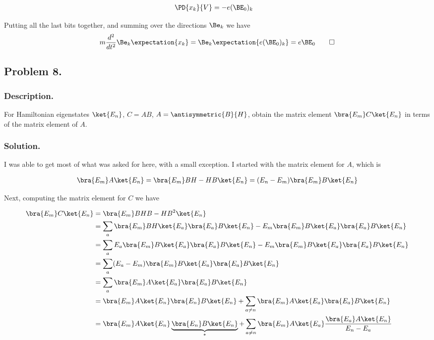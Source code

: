 \begin{align*}
\PD{x_k}{V} &= - e (\BE_0)_k
\end{align*}

Putting all the last bits together, and summing over the directions $\Be_k$ we have
\begin{align*}
m \frac{d^2}{dt^2} \Be_k \expectation{x_k} 
= \Be_k \expectation{ e (\BE_0)_k }
= e \BE_0
\qquad\square
\end{align*}

\subsection{Problem 8. }

\subsubsection{Description. }

For Hamiltonian eigenstates $\ket{E_n}$, $C = AB$, $A = \antisymmetric{B}{H}$, obtain the matrix element $\bra{E_m} C \ket{E_n}$ in terms of the matrix element of $A$.

\subsubsection{Solution. }

I was able to get most of what was asked for here, with a small exception.  I started with the matrix element for $A$, which is

\begin{align}\label{eqn:desaiCh3:800}
\bra{E_m} A \ket{E_n}
=
\bra{E_m} BH - HB \ket{E_n} 
=
(E_n - E_m)\bra{E_m} B \ket{E_n} 
\end{align}

Next, computing the matrix element for $C$ we have

\begin{align*}
\bra{E_m} C \ket{E_n}
&=
\bra{E_m} BHB - HB^2 \ket{E_n} \\
&=
\sum_a \bra{E_m} BH \ket{E_a}\bra{E_a} B \ket{E_n} - E_m \bra{E_m} B \ket{E_a} \bra{E_a} B \ket{E_n} \\
&=
\sum_a E_a \bra{E_m} B \ket{E_a}\bra{E_a} B \ket{E_n} -E_m \bra{E_m} B \ket{E_a} \bra{E_a} B \ket{E_n} \\
&=
\sum_a (E_a - E_m)\bra{E_m} B \ket{E_a}\bra{E_a} B \ket{E_n} \\
&=
\sum_a \bra{E_m} A \ket{E_a} \bra{E_a} B \ket{E_n} \\
&=
\bra{E_m} A \ket{E_n} \bra{E_n} B \ket{E_n} 
+\sum_{a \ne n} \bra{E_m} A \ket{E_a} \bra{E_a} B \ket{E_n} \\
&=
\bra{E_m} A \ket{E_n} \underbrace{\bra{E_n} B \ket{E_n} }_{\text{*}}
+\sum_{a \ne n} \bra{E_m} A \ket{E_a} 
\frac{\bra{E_a} A \ket{E_n}}{E_n - E_a}
\end{align*}

